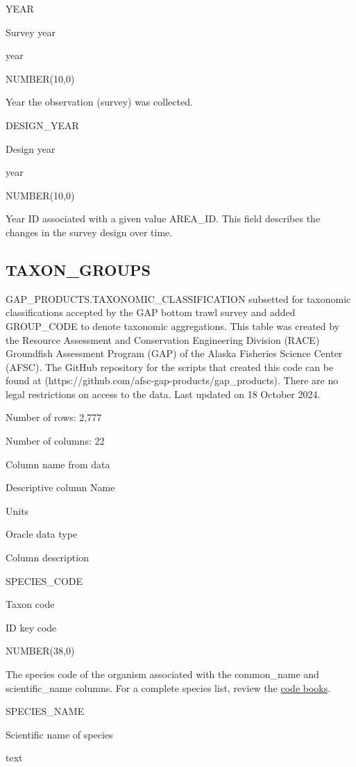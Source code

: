 \documentclass[
  letterpaper,
  oneside,
  open=any]{scrbook}
\begin{document}
YEAR

Survey year

year

NUMBER(10,0)

Year the observation (survey) was collected.

DESIGN\_YEAR

Design year

year

NUMBER(10,0)

Year ID associated with a given value AREA\_ID. This field describes the
changes in the survey design over time.

\subsection{TAXON\_GROUPS}\label{taxon_groups}

GAP\_PRODUCTS.TAXONOMIC\_CLASSIFICATION subsetted for taxonomic
classifications accepted by the GAP bottom trawl survey and added
GROUP\_CODE to denote taxonomic aggregations. This table was created by
the Resource Assessment and Conservation Engineering Division (RACE)
Groundfish Assessment Program (GAP) of the Alaska Fisheries Science
Center (AFSC). The GitHub repository for the scripts that created this
code can be found at
(https://github.com/afsc-gap-products/gap\_products). There are no legal
restrictions on access to the data. Last updated on 18 October 2024.

Number of rows: 2,777

Number of columns: 22

Column name from data

Descriptive column Name

Units

Oracle data type

Column description

SPECIES\_CODE

Taxon code

ID key code

NUMBER(38,0)

The species code of the organism associated with the common\_name and
scientific\_name columns. For a complete species list, review the
\href{https://www.fisheries.noaa.gov/resource/document/groundfish-survey-species-code-manual-and-data-codes-manual}{code
books}.

SPECIES\_NAME

Scientific name of species

text
\end{document}
